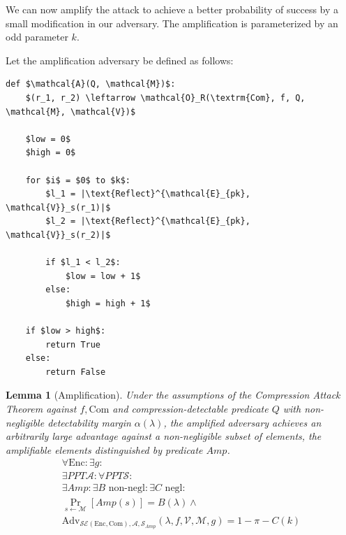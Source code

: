 \documentclass[conference, letterpaper, 10pt]{IEEEtran}
\newtheorem{lemma}{Lemma}
\begin{document}
We can now amplify the attack to achieve a better probability of success by a small modification in our adversary.
The amplification is parameterized by an odd parameter $k$.

Let the amplification adversary be defined as follows:

\begin{lstlisting}[texcl,mathescape,basicstyle=\small]
def $\mathcal{A}(Q, \mathcal{M})$:
    $(r_1, r_2) \leftarrow \mathcal{O}_R(\textrm{Com}, f, Q, \mathcal{M}, \mathcal{V})$

    $low = 0$
    $high = 0$

    for $i$ = $0$ to $k$:
        $l_1 = |\text{Reflect}^{\mathcal{E}_{pk}, \mathcal{V}}_s(r_1)|$
        $l_2 = |\text{Reflect}^{\mathcal{E}_{pk}, \mathcal{V}}_s(r_2)|$

        if $l_1 < l_2$:
            $low = low + 1$
        else:
            $high = high + 1$

    if $low > high$:
        return True
    else:
        return False
\end{lstlisting}

\begin{lemma}[Amplification]

Under the assumptions of the Compression Attack Theorem against $f, \textrm{Com}$
and compression-detectable predicate $Q$ with non-negligible
detectability margin $\alpha(\lambda)$,
the amplified adversary achieves an arbitrarily large advantage
against a non-negligible subset of elements, the
\textit{amplifiable elements} distinguished by predicate $Amp$.
\begin{align*}
    \forall \textrm{Enc}:
    \exists g:\\
    \exists PPT \mathcal{A}:
    \forall PPT \mathcal{S}:\\
    \exists Amp:
    \exists B \text{ non-negl}:
    \exists C \text{ negl}:\\
    \Pr_{s \leftarrow \mathcal{M}}[Amp(s)] = B(\lambda) \land\\
    \text{Adv}_{\mathcal{SE}(\textrm{Enc}, \textrm{Com}), \mathcal{A}, \mathcal{S}_{Amp}}
    (\lambda, f, \mathcal{V}, \mathcal{M}, g) = 1 - \pi - C(k)
\end{align*}

\end{lemma}
\end{document}
